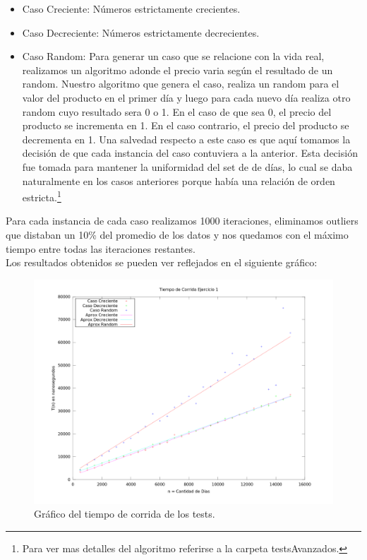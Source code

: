 \begin{itemize}
 \item Caso Creciente: Números estrictamente crecientes.
 \item Caso Decreciente: Números estrictamente decrecientes.
 \item Caso Random: Para generar un caso que se relacione con la vida real,
realizamos un algoritmo adonde el precio varia según el resultado de un
random. Nuestro algoritmo que genera el caso, realiza un random para el valor
del producto en el primer día y luego para cada nuevo día realiza otro random
cuyo resultado sera 0 o 1. En el caso de que sea 0, el precio del producto se
incrementa en 1. En el caso contrario, el precio del producto se decrementa en
1. Una salvedad respecto a este caso es que aquí tomamos la decisión de que cada
instancia del caso contuviera a la anterior. Esta decisión fue
tomada para mantener la uniformidad del set de de días, lo cual se daba
naturalmente en los casos
anteriores porque había una relación de orden estricta.\footnote{Para ver mas
detalles del algoritmo referirse a la carpeta
testsAvanzados.}
\end{itemize}

\indent Para cada instancia de cada caso realizamos 1000 iteraciones, eliminamos
outliers que distaban un 10\% del promedio de los datos y nos quedamos con el
máximo tiempo entre todas las iteraciones
restantes.\\
\indent Los resultados obtenidos se pueden ver reflejados en el
siguiente gráfico:

\begin{figure}[h]
\centering                                                       
        \includegraphics[width=420pt]{./figs/ej1.png}
	\caption{Gráfico del tiempo de corrida de los tests.}
	\label{fig:p1tiempos}
\end{figure}


